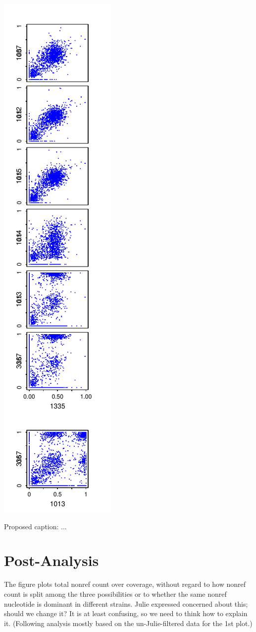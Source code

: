 \documentclass{article}\usepackage[]{graphicx}\usepackage[]{color}
\begin{document}
\includegraphics{Fig1-mscat-figs/6+1julie2T.pdf}

Proposed caption: ...

\section{Post-Analysis}\label{sec:post}
The figure plots total nonref count over coverage, without regard to how nonref count is split among the three possibilities or to whether the same nonref nucleotide is dominant in different strains.  Julie expressed concerned about this; should we change it? It is at least confusing, so we need to think how to explain it. (Following analysis mostly based on the un-Julie-filtered data for the 1st plot.)
\end{document}
